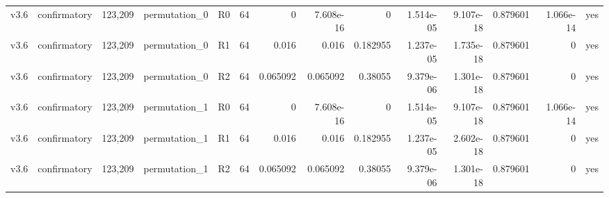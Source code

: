 \begin{table}[tb]
{\begin{tabular}{lrrrrrrrrrrrrr}
v3.6 & confirmatory & 123,209 & permutation\_0 & R0 & 64 & 0 & 7.608e-16 & 0 & 1.514e-05 & 9.107e-18 & 0.879601 & 1.066e-14 & yes \\
v3.6 & confirmatory & 123,209 & permutation\_0 & R1 & 64 & 0.016 & 0.016 & 0.182955 & 1.237e-05 & 1.735e-18 & 0.879601 & 0 & yes \\
v3.6 & confirmatory & 123,209 & permutation\_0 & R2 & 64 & 0.065092 & 0.065092 & 0.38055 & 9.379e-06 & 1.301e-18 & 0.879601 & 0 & yes \\
v3.6 & confirmatory & 123,209 & permutation\_1 & R0 & 64 & 0 & 7.608e-16 & 0 & 1.514e-05 & 9.107e-18 & 0.879601 & 1.066e-14 & yes \\
v3.6 & confirmatory & 123,209 & permutation\_1 & R1 & 64 & 0.016 & 0.016 & 0.182955 & 1.237e-05 & 2.602e-18 & 0.879601 & 0 & yes \\
v3.6 & confirmatory & 123,209 & permutation\_1 & R2 & 64 & 0.065092 & 0.065092 & 0.38055 & 9.379e-06 & 1.301e-18 & 0.879601 & 0 & yes \\
\bottomrule
\end{tabular}%
}
\end{table}
